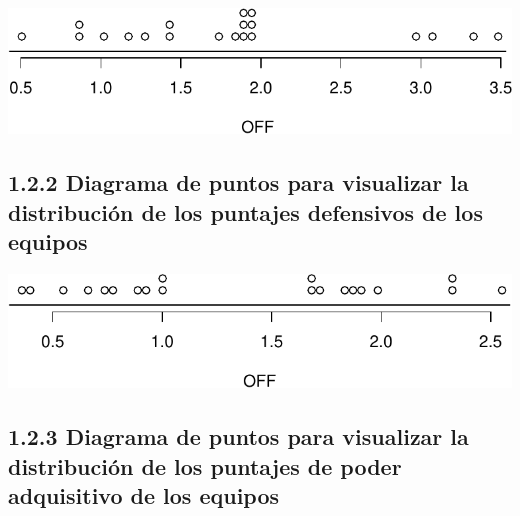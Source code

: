 \documentclass[]{article}
\newenvironment{Shaded}{\begin{snugshade}}{\end{snugshade}}
\newcommand{\DataTypeTok}[1]{\textcolor[rgb]{0.13,0.29,0.53}{#1}}
\newcommand{\KeywordTok}[1]{\textcolor[rgb]{0.13,0.29,0.53}{\textbf{#1}}}
\newcommand{\NormalTok}[1]{#1}
\newcommand{\OperatorTok}[1]{\textcolor[rgb]{0.81,0.36,0.00}{\textbf{#1}}}
\newcommand{\StringTok}[1]{\textcolor[rgb]{0.31,0.60,0.02}{#1}}
\begin{document}
\begin{Shaded}
\end{Shaded}

\includegraphics{pep1_files/figure-latex/unnamed-chunk-5-1.pdf}

\hypertarget{diagrama-de-puntos-para-visualizar-la-distribucion-de-los-puntajes-defensivos-de-los-equipos}{%
\subsection{1.2.2 Diagrama de puntos para visualizar la distribución de
los puntajes defensivos de los
equipos}\label{diagrama-de-puntos-para-visualizar-la-distribucion-de-los-puntajes-defensivos-de-los-equipos}}

\begin{Shaded}
\end{Shaded}

\includegraphics{pep1_files/figure-latex/unnamed-chunk-6-1.pdf}

\hypertarget{diagrama-de-puntos-para-visualizar-la-distribucion-de-los-puntajes-de-poder-adquisitivo-de-los-equipos}{%
\subsection{1.2.3 Diagrama de puntos para visualizar la distribución de
los puntajes de poder adquisitivo de los
equipos}\label{diagrama-de-puntos-para-visualizar-la-distribucion-de-los-puntajes-de-poder-adquisitivo-de-los-equipos}}
\end{document}
